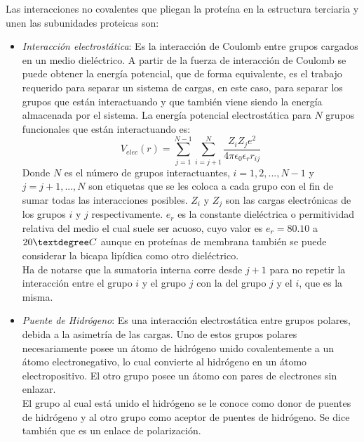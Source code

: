 Las interacciones no covalentes que pliegan la prote\'{i}na en la estructura terciaria y unen las subunidades proteicas son: \cite{Kuchel}
\begin{itemize}
 \item \textit{Interacci\'{o}n electrost\'{a}tica}: Es la interacci\'{o}n de Coulomb entre grupos cargados en un medio diel\'{e}ctrico. A partir de la fuerza de interacci\'{o}n de Coulomb se puede obtener la energ\'{i}a potencial, que de forma equivalente, es el trabajo requerido para separar un sistema de cargas, en este caso, para separar los grupos que est\'{a}n interactuando y que tambi\'{e}n viene siendo la energ\'{i}a almacenada por el sistema. La energ\'{i}a potencial electrost\'{a}tica para $N$ grupos funcionales que est\'{a}n interactuando es:
\begin{equation}
V_{elec}(r)=\sum_{j=1}^{N-1}\sum_{i=j+1}^{N}\frac{Z_{i}Z_{j}e^2}{4 \pi \epsilon_0 \epsilon_{r} r_{ij}}
\end{equation}
Donde $N$ es el n\'{u}mero de grupos interactuantes, $i=1,2,...,N-1$ y $j=j+1,...,N$ son etiquetas que se les coloca a cada grupo con el fin de sumar todas las interacciones posibles. $Z_{i}$ y $Z_{j}$ son las cargas electr\'{o}nicas de los grupos $i$ y $j$ respectivamente. $e_r$ es la constante diel\'{e}ctrica o permitividad relativa del medio el cual suele ser acuoso, cuyo valor es $e_r=80.10$ a $20\textdegree C$ aunque en prote\'{i}nas de membrana tambi\'{e}n se puede considerar la bicapa lip\'{i}dica como otro diel\'{e}ctrico.\\
Ha de notarse que la sumatoria interna corre desde $j+1$ para no repetir la interacci\'{o}n entre el grupo $i$ y el grupo $j$ con la del grupo $j$ y el $i$, que es la misma.\\

  \item \textit{Puente de Hidr\'{o}geno}: Es una interacci\'{o}n electrost\'{a}tica entre grupos polares, debida a la asimetr\'{i}a de las cargas. Uno de estos grupos polares necesariamente posee un \'{a}tomo de hidr\'{o}geno unido covalentemente a un \'{a}tomo electronegativo, lo cual convierte al hidr\'{o}geno en un \'{a}tomo electropositivo. El otro grupo posee un \'{a}tomo con pares de electrones sin enlazar.\\
  El grupo al cual est\'{a} unido el hidr\'{o}geno se le conoce como donor de puentes de hidr\'{o}geno y al otro grupo como aceptor de puentes de hidr\'{o}geno. Se dice tambi\'{e}n que es un enlace de polarizaci\'{o}n.
 

\end{itemize}

